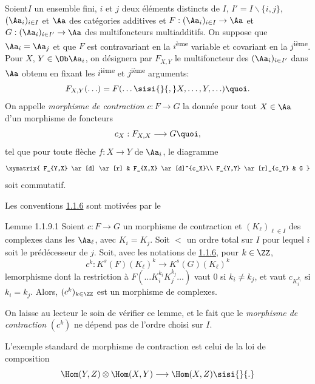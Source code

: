 \documentclass[10pt]{../fichiers-configuration-latex/smfart}
\begin{document}
\subsubsection{}
Soient\pageoriginale $I$ un ensemble fini, $i$ et $j$ deux éléments
distincts de $I$, $I'=I\backslash\{i,j\}$, $(\Aa_i)_{i\in I}$ et
$\Aa$ des catégories additives et $F:(\Aa_i)_{i\in
  I}\rightarrow \Aa$ et $G:(\Aa_i)_{i\in
  I'}\rightarrow \Aa$ des multifoncteurs multiadditifs. On
suppose que $\Aa_i=\Aa_j$ et que $F$ est contravariant
en la $i$\textsuperscript{ème} variable et covariant en la $j$\textsuperscript{ième}. Pour $X$, $Y\in \Ob \Aa_i$, on désignera par
$F_{X,Y}$ le multifoncteur des $(\Aa_i)_{i\in I'}$ dans
$\Aa$ obtenu en fixant les $i$\textsuperscript{ième} et $j$\textsuperscript{ième}
arguments:
\[
F_{X,Y}(\ldots)=F(\ldots\sisi{}{,} X,\ldots,Y,\ldots){\quoi}.
\]
On appelle \emph{morphisme de contraction} $c:F\rightarrow G$ la
donnée pour tout $X\in \Aa$ d'un morphisme de foncteurs
\[
c_{X}:F_{X,X}\longrightarrow G{\quoi},
\]
tel que pour toute flèche $f:X\rightarrow Y$ de $\Aa_i$, le
diagramme
\[
\xymatrix{
F_{Y,X} \ar[d] \ar[r] & F_{X,X} \ar[d]^{c_X}\\
F_{Y,Y}  \ar[r]_{c_Y}     & G
}
\]
soit commutatif.

Les conventions \hyperref[XVII.subsubsec1.1.6]{1.1.6} sont motivées par le

\begin{enonce*}{Lemme 1.1.9.1}
Soient $c:F\rightarrow G$ un morphisme de contraction et
$(K_{\ell})_{\ell \in I}$ des complexes dans les $\Aa_{\ell}$, avec
$K_{i}=K_{j}$. Soit $<$ un ordre total sur $I$ pour lequel $i$ soit le
prédécesseur de $j$. Soit, avec les notations de
\hyperref[XVII.subsubsec1.1.6]{1.1.6}, pour $k\in \ZZ$,
\[
c^{k}:K^{s}(F)(K_{\ell})^{k}\longrightarrow K^{s}(G)(K_{\ell})^{k}
\]
le\pageoriginale morphisme dont la restriction à $F(\ldots
K_{i}^{k_i}K_{j}^{k_j}\ldots)$ vaut $0$ si $k_i\neq k_j$, et vaut
$c_{K_i^{k_i}}$ si $k_{i}=k_{j}$. Alors, $(c^{k})_{k\in \ZZ}$
est un morphisme de complexes.
\end{enonce*}

On laisse au lecteur le soin de vérifier ce lemme, et le fait que le
\emph{morphisme de contraction} $(c^{k})$ ne dépend pas de l'ordre
choisi sur $I$.

L'exemple standard de morphisme de contraction est celui de la loi de
composition
\[
\Hom(Y,Z)\otimes \Hom(X,Y)\longrightarrow \Hom(X,Z)\sisi{}{.}
\]
\end{document}
